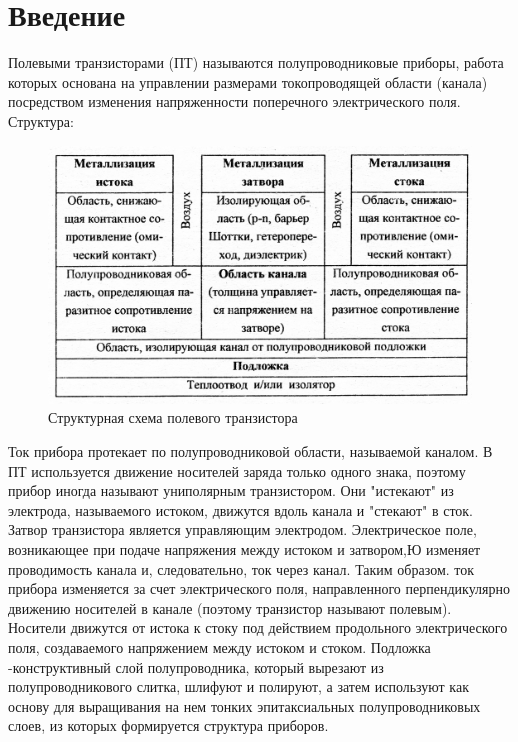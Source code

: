 



\def\labauthors{Карусевич А.А., Шиков А.П.}
\def\labgroup{440}
\def\labnumber{2}
\def\labtheme{Измерение статистических характеристик полевого транзистора}
\renewcommand{\vec}{\mathbf}
\renewcommand{\phi}{\varphi}
\renewcommand{\hat}{\widehat}



\section{Введение}
Полевыми транзисторами (ПТ) называются полупроводниковые приборы, работа которых основана на управлении размерами токопроводящей области (канала) посредством изменения напряженности поперечного электрического поля. Структура:
\begin{figure}[h!]
	\centering
	\includegraphics[width=0.5\linewidth]{imgs/fig1.jpg}
	\caption{Структурная схема полевого транзистора}
	\label{fig:1}
\end{figure}

Ток прибора протекает по полупроводниковой области, называемой каналом. В ПТ используется движение носителей заряда только одного знака, поэтому прибор иногда называют униполярным транзистором. Они "истекают" из электрода, называемого истоком, движутся вдоль канала и "стекают" в сток. Затвор транзистора является управляющим электродом. Электрическое поле, возникающее при подаче напряжения между истоком и затвором,Ю изменяет проводимость канала и, следовательно, ток через канал. Таким образом. ток прибора изменяется за счет электрического поля, направленного перпендикулярно движению носителей в канале (поэтому транзистор называют полевым). Носители движутся от истока к стоку под действием продольного электрического поля, создаваемого напряжением между истоком и стоком. Подложка -конструктивный слой полупроводника, который вырезают из полупроводникового слитка, шлифуют и полируют, а затем используют как основу для выращивания на нем тонких эпитаксиальных полупроводниковых слоев, из которых формируется структура приборов.

